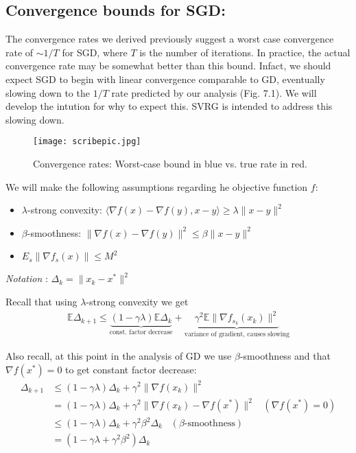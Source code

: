 \documentclass[12pt]{report}
\def \E{\mathbb E}
\begin{document}
\subsection{Convergence bounds for SGD:}

The convergence rates we derived previously suggest a worst case convergence rate of $\sim 1/T$ for SGD, where $T$ is the  number of iterations. In practice, the actual convergence rate may be somewhat better than this bound. Infact, we should expect SGD to begin with linear convergence comparable to GD, eventually slowing down to the $1/T$ rate predicted by our analysis (Fig. 7.1). We will develop the intution for why to expect this. SVRG is intended to address this slowing down.

\begin{figure}[h!]
\centering
\texttt{[image: scribepic.jpg]}
\caption{Convergence rates: Worst-case bound in blue vs. true rate in red. }
\end{figure}

We will make the following assumptions regarding he objective function $f$: 
\begin{itemize}
\item $\lambda$-strong convexity: $\langle \nabla f(x) -\nabla f(y), x-y\rangle \ge \lambda \|x -y\|^2$
\item $\beta$-smoothness: $\| \nabla f(x) - \nabla f(y) \|^2 \le \beta  \|x -y\|^2$
\item $E_s \| \nabla f_s (x)\| \le M^2$ 
\end{itemize}

%

\textit{Notation} : $\Delta_k = \| x_k - x^*\|^2$

Recall that using $\lambda$-strong convexity we get 
\begin{align*}
 \E \Delta_{k+1}  \le \underbrace{(1- \gamma \lambda) \E \Delta _k}_{\text{const. factor decrease}} + \underbrace{\gamma^2 \E \| \nabla f_{s_k} (x_k)\|^2 }_{\text{variance of gradient, causes slowing}}
\end{align*}

Also recall, at this point in the analysis of GD we use $\beta$-smoothness and that $\nabla f(x^*) =0$ to get constant factor decrease:
\begin{align*}
  \Delta_{k+1}  & \le (1- \gamma \lambda) \Delta _k + \gamma^2  \| \nabla f (x_k)\|^2 \\
&= (1- \gamma \lambda) \Delta _k + \gamma^2  \| \nabla f (x_k)- \nabla f(x^*)\|^2 \;\;\;(\nabla f(x^*) = 0)\\
& \le (1- \gamma \lambda)  \Delta _k + \gamma^2 \beta^2 \Delta_k  \;\;\;(\beta\text{-smoothness})\\
&= (1- \gamma \lambda + \gamma^2 \beta^2 ) \Delta_k
\end{align*}
\end{document}

